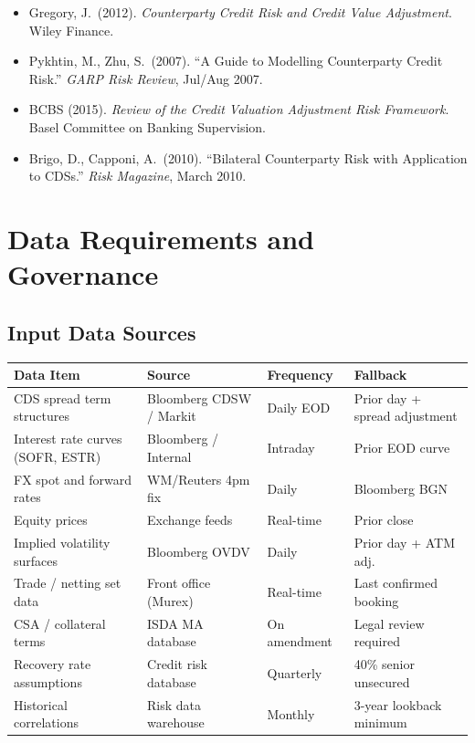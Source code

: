 \documentclass[11pt,a4paper]{article}
\begin{document}
\begin{itemize}[noitemsep]
  \item Gregory, J.\ (2012). \textit{Counterparty Credit Risk and Credit Value
        Adjustment}. Wiley Finance.
  \item Pykhtin, M., Zhu, S.\ (2007). ``A Guide to Modelling Counterparty
        Credit Risk.'' \textit{GARP Risk Review}, Jul/Aug 2007.
  \item BCBS (2015). \textit{Review of the Credit Valuation Adjustment Risk
        Framework}. Basel Committee on Banking Supervision.
  \item Brigo, D., Capponi, A.\ (2010). ``Bilateral Counterparty Risk with
        Application to CDSs.'' \textit{Risk Magazine}, March 2010.
\end{itemize}

\section{Data Requirements and Governance}

\subsection{Input Data Sources}

\begin{longtable}{@{}llll@{}}
\toprule
\textbf{Data Item} & \textbf{Source} & \textbf{Frequency} & \textbf{Fallback} \\
\midrule
\endhead
\bottomrule
\endfoot
CDS spread term structures   & Bloomberg CDSW / Markit & Daily EOD   & Prior day + spread adjustment \\
Interest rate curves (SOFR, ESTR) & Bloomberg / Internal & Intraday & Prior EOD curve \\
FX spot and forward rates    & WM/Reuters 4pm fix       & Daily       & Bloomberg BGN \\
Equity prices                & Exchange feeds           & Real-time   & Prior close \\
Implied volatility surfaces  & Bloomberg OVDV           & Daily       & Prior day + ATM adj. \\
Trade / netting set data     & Front office (Murex)     & Real-time   & Last confirmed booking \\
CSA / collateral terms       & ISDA MA database         & On amendment & Legal review required \\
Recovery rate assumptions    & Credit risk database     & Quarterly   & 40\% senior unsecured \\
Historical correlations      & Risk data warehouse      & Monthly     & 3-year lookback minimum \\
\end{longtable}
\end{document}
